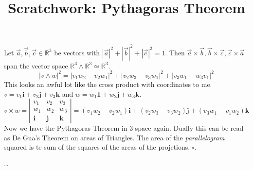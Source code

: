 \documentclass[12pt]{article}
\title{Scratchwork: Pythagoras Theorem}
\date{}
\begin{document}
\sffamily

\maketitle

\noindent Let $\vec{a}, \vec{b}, \vec{c} \in \mathbb{R}^3$ be vectors with $|\vec{a}|^2 + |\vec{b}|^2 + |\vec{c}|^2 = 1$.  Then $\vec{a} \times \vec{b}, \vec{b} \times \vec{c}, \vec{c} \times \vec{a}$ span the vector space $\mathbb{R}^3 \wedge \mathbb{R}^3 \simeq \mathbb{R}^3$.
$$
|  v \wedge w|^2 = |v_1 w_2 - v_2 w_1|^2 + |v_2 w_3 - v_3 w_1|^2 + |v_3 w_1 - w_3 v_1|^2  $$
This looks an awful lot like the cross product with coordinates to me.  $v = v_1 \mathbf{i} + v_2 \mathbf{j} + v_3 \mathbf{k}$ and $w = w_1 \mathbf{1} + w_2 \mathbf{j} + w_3 \mathbf{k}$.  
$$ 
v \times w = \left|
\begin{array}{ccc}
v_1 & v_2 & v_3 \\ w_1 & w_2 & w_3 \\ \mathbf{i} & \mathbf{j} & \mathbf{k} \end{array} \right|
= 
(v_1 w_2 - v_2 w_1) \mathbf{i} + (v_2 w_3 - v_3 w_2)\mathbf{j} + (v_3 w_1 - v_1 w_2)\mathbf{k}
$$
Now we have the Pythagoras Theorem in 3-space again.  Dually this can be read as De Gua's Theorem on areas of Triangles.  The area of the \textit{parallelogram} squared is te sum of the squares of the areas of the projetions. \hfill $\square$.
\vfill
\begin{thebibliography}{} 
\item \dots 
\end{thebibliography}
\end{document}
